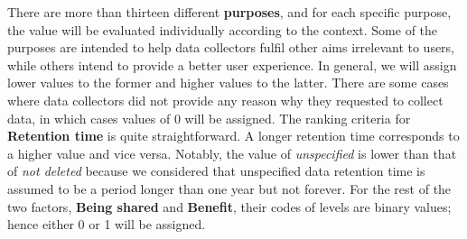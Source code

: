 \documentclass[msc,deptreport,ai]{infthesis}      %
\begin{document}
There are more than thirteen different \textbf{purposes}, and for each specific purpose, the value will be evaluated individually according to the context. Some of the purposes are intended to help data collectors fulfil other aims irrelevant to users, while others intend to provide a better user experience. In general, we will assign lower values to the former and higher values to the latter. There are some cases where data collectors did not provide any reason why they requested to collect data, in which cases values of 0 will be assigned. The ranking criteria for \textbf{Retention time} is quite straightforward. A longer retention time corresponds to a higher value and vice versa. Notably, the value of \textit{unspecified} is lower than that of \textit{not deleted} because we considered that unspecified data retention time is assumed to be a period longer than one year but not forever. For the rest of the two factors, \textbf{Being shared} and \textbf{Benefit}, their codes of levels are binary values; hence either 0 or 1 will be assigned.
\end{document}
